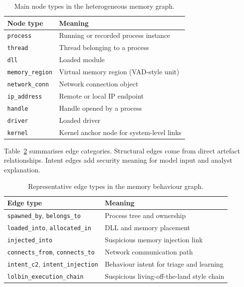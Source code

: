 \begin{table}[htbp]
\centering
\caption{Main node types in the heterogeneous memory graph.}
\label{tab:node_types}
\begin{tabular}{ll}
\toprule
\textbf{Node type} & \textbf{Meaning} \\
\midrule
\texttt{process} & Running or recorded process instance \\
\texttt{thread} & Thread belonging to a process \\
\texttt{dll} & Loaded module \\
\texttt{memory\_region} & Virtual memory region (VAD-style unit) \\
\texttt{network\_conn} & Network connection object \\
\texttt{ip\_address} & Remote or local IP endpoint \\
\texttt{handle} & Handle opened by a process \\
\texttt{driver} & Loaded driver \\
\texttt{kernel} & Kernel anchor node for system-level links \\
\bottomrule
\end{tabular}
\end{table}

Table~\ref{tab:edge_types} summarises edge categories. Structural edges come from direct artefact relationships. Intent edges add security meaning for model input and analyst explanation.

\begin{table}[htbp]
\centering
\caption{Representative edge types in the memory behaviour graph.}
\label{tab:edge_types}
\small
\begin{tabular}{p{3.6cm}p{8.4cm}}
\toprule
\textbf{Edge type} & \textbf{Meaning} \\
\midrule
\texttt{spawned\_by}, \texttt{belongs\_to} & Process tree and ownership \\
\texttt{loaded\_into}, \texttt{allocated\_in} & DLL and memory placement \\
\texttt{injected\_into} & Suspicious memory injection link \\
\texttt{connects\_from}, \texttt{connects\_to} & Network communication path \\
\texttt{intent\_c2}, \texttt{intent\_injection} & Behaviour intent for triage and learning \\
\texttt{lolbin\_execution\_chain} & Suspicious living-off-the-land style chain \\
\bottomrule
\end{tabular}
\end{table}

